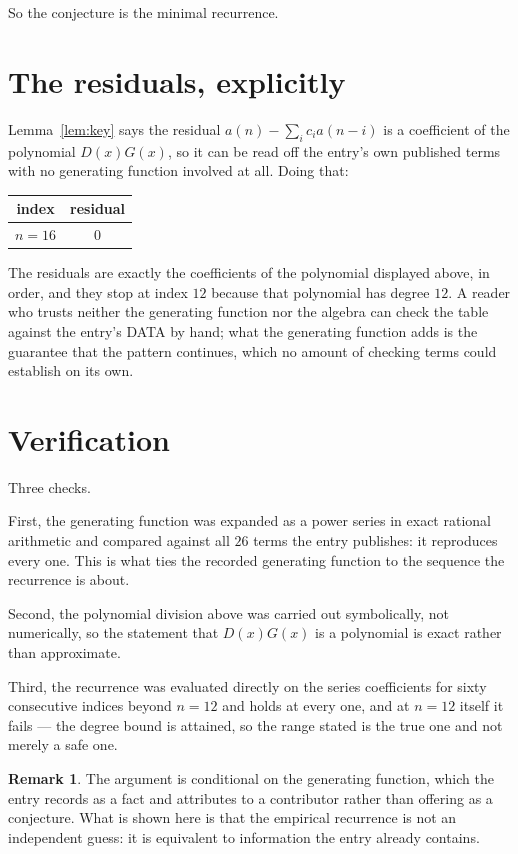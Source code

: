 \documentclass[11pt,a4paper]{article}
\theoremstyle{plain}
\theoremstyle{definition}
\newtheorem{remark}[theorem]{Remark}
\begin{document}
So the conjecture is the minimal recurrence.

\section{The residuals, explicitly}

Lemma~\ref{lem:key} says the residual $a(n)-\sum_ic_ia(n-i)$ is a coefficient of the
polynomial $D(x)G(x)$, so it can be read off the entry's own published terms with no
generating function involved at all. Doing that:
\begin{center}
\begin{tabular}{cc}
index & residual \\ \hline
$n=16$ & $0$
\end{tabular}
\end{center}
The residuals are exactly the coefficients of the polynomial displayed above, in order, and
they stop at index $12$ because that polynomial has degree $12$. A reader who trusts
neither the generating function nor the algebra can check the table against the entry's DATA
by hand; what the generating function adds is the guarantee that the pattern continues, which
no amount of checking terms could establish on its own.

\section{Verification}

Three checks.

First, the generating function was expanded as a power series in exact rational arithmetic and
compared against all $26$ terms the entry publishes: it reproduces every one. This is
what ties the recorded generating function to the sequence the recurrence is about.

Second, the polynomial division above was carried out symbolically, not numerically, so the
statement that $D(x)G(x)$ is a polynomial is exact rather than approximate.

Third, the recurrence was evaluated directly on the series coefficients for sixty consecutive
indices beyond $n=12$ and holds at every one, and at $n=12$ itself it fails --- the
degree bound is attained, so the range stated is the true one and not merely a safe one.

\begin{remark}
The argument is conditional on the generating function, which the entry records as a fact and
attributes to a contributor rather than offering as a conjecture. What is shown here is that
the empirical recurrence is not an independent guess: it is equivalent to information the
entry already contains.
\end{remark}
\end{document}
